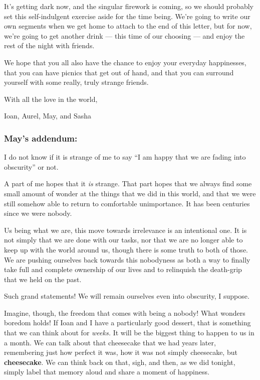 It's getting dark now, and the singular firework is coming, so we should probably set this self-indulgent exercise aside for the time being. We're going to write our own segments when we get home to attach to the end of this letter, but for now, we're going to get another drink — this time of our choosing — and enjoy the rest of the night with friends.

We hope that you all also have the chance to enjoy your everyday happinesses, that you can have picnics that get out of hand, and that you can surround yourself with some really, truly strange friends.

With all the love in the world,

Ioan, Aurel, May, and Sasha

\hypertarget{mays-addendum}{%
\subsubsection{May's addendum:}\label{mays-addendum}}

I do not know if it is strange of me to say ``I am happy that we are fading into obscurity'' or not.

A part of me hopes that it \emph{is} strange. That part hopes that we always find some small amount of wonder at the things that we did in this world, and that we were still somehow able to return to comfortable unimportance. It has been centuries since we were nobody.

Us being what we are, this move towards irrelevance is an intentional one. It is not simply that we are done with our tasks, nor that we are no longer able to keep up with the world around us, though there is some truth to both of those. We are pushing ourselves back towards this nobodyness as both a way to finally take full and complete ownership of our lives and to relinquish the death-grip that we held on the past.

Such grand statements! We will remain ourselves even into obscurity, I suppose.

Imagine, though, the freedom that comes with being a nobody! What wonders boredom holds! If Ioan and I have a particularly good dessert, that is something that we can think about for \emph{weeks.} It will be the biggest thing to happen to us in a month. We can talk about that cheesecake that we had years later, remembering just how perfect it was, how it was not simply cheesecake, but \textbf{cheesecake}. We can think back on that, sigh, and then, as we did tonight, simply label that memory aloud and share a moment of happiness.


